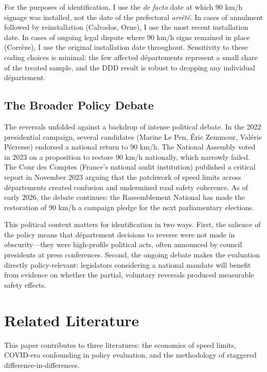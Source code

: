 \documentclass[12pt]{article}
\begin{document}
For the purposes of identification, I use the \textit{de facto} date at which 90 km/h signage was installed, not the date of the prefectoral \textit{arr\^{e}t\'{e}}. In cases of annulment followed by reinstallation (Calvados, Orne), I use the most recent installation date. In cases of ongoing legal dispute where 90 km/h signs remained in place (Corr\`{e}ze), I use the original installation date throughout. Sensitivity to these coding choices is minimal: the few affected d\'{e}partements represent a small share of the treated sample, and the DDD result is robust to dropping any individual d\'{e}partement.

\subsection{The Broader Policy Debate}

The reversals unfolded against a backdrop of intense political debate. In the 2022 presidential campaign, several candidates (Marine Le Pen, \'{E}ric Zemmour, Val\'{e}rie P\'{e}cresse) endorsed a national return to 90 km/h. The National Assembly voted in 2023 on a proposition to restore 90 km/h nationally, which narrowly failed. The Cour des Comptes (France's national audit institution) published a critical report in November 2023 arguing that the patchwork of speed limits across d\'{e}partements created confusion and undermined road safety coherence. As of early 2026, the debate continues: the Rassemblement National has made the restoration of 90 km/h a campaign pledge for the next parliamentary elections.

This political context matters for identification in two ways. First, the salience of the policy means that d\'{e}partement decisions to reverse were not made in obscurity---they were high-profile political acts, often announced by council presidents at press conferences. Second, the ongoing debate makes the evaluation directly policy-relevant: legislators considering a national mandate will benefit from evidence on whether the partial, voluntary reversals produced measurable safety effects.


\section{Related Literature} \label{sec:literature}

This paper contributes to three literatures: the economics of speed limits, COVID-era confounding in policy evaluation, and the methodology of staggered difference-in-differences.
\end{document}
